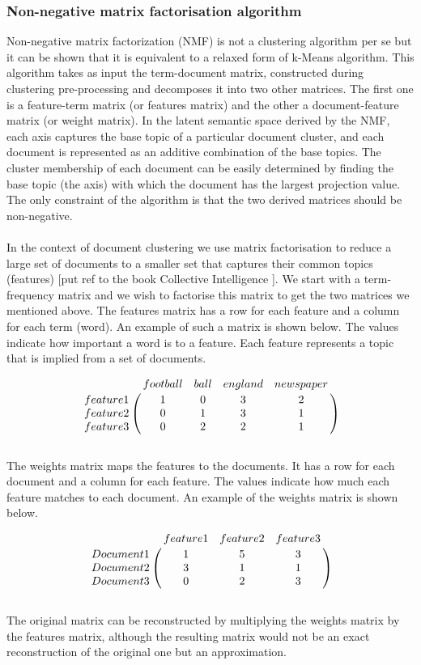 \subsubsection{Non-negative matrix factorisation algorithm}
Non-negative matrix factorization (NMF) is not a clustering algorithm per se but it can be shown that it is equivalent to a relaxed form of k-Means algorithm. This algorithm takes as input the term-document matrix, constructed during clustering pre-processing and decomposes it into two other matrices. The first one is a feature-term matrix (or features matrix) and the other a document-feature matrix (or weight matrix). In the latent semantic space derived by the NMF, each axis captures the base topic of a particular document cluster, and each document is represented as an additive combination of the base topics. The cluster membership of each document can be easily determined by finding the base topic (the axis) with which the document has the largest projection value. The only constraint of the algorithm is that the two derived matrices should be non-negative.\\\\ 
In the context of document clustering we use matrix factorisation to reduce a large set of documents to a smaller set that captures their common topics (features) [put ref to the book Collective Intelligence ]. We start with a term-frequency matrix and we wish to factorise this matrix to get the two matrices we mentioned above. The features matrix has a row for each feature and a column for each term (word). An example of such a matrix is shown below. The values indicate how important a word is to a feature. Each feature represents a topic that is implied from a set of documents. 

\[
\bordermatrix{~ & football & ball & england & newspaper \cr
                  feature 1 & 1 & 0 & 3 & 2 \cr
                  feature 2 & 0 & 1 & 3 & 1\cr
                  feature 3 & 0 & 2 & 2 & 1\cr}
\]\\
The weights matrix maps the features to the documents. It has a row for each document and a column for each feature. The values indicate how much each feature matches to each document. An example of the weights matrix is shown below. 

\[
\bordermatrix{~ & feature 1 & feature 2 & feature 3\cr
                  Document 1 & 1 & 5 & 3\cr
                  Document 2 & 3 & 1 & 1\cr
                  Document 3 & 0 & 2 & 3\cr}
\] \\
The original matrix can be reconstructed by multiplying the weights matrix by the features matrix, although the resulting matrix would not be an exact reconstruction of the original one but an approximation. 


